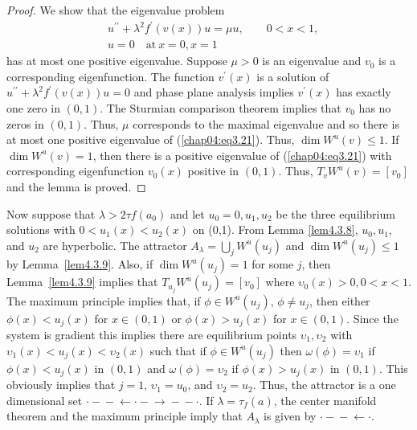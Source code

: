 \documentclass{surv-l}
\theoremstyle{plain}
\theoremstyle{definition}
\numberwithin{equation}{section}
\numberwithin{figure}{chapter}
\begin{document}
\begin{proof} We show that the eigenvalue problem
\begin{equation}\label{chap04:eq3.21}
\begin{split}
&u^{\prime\prime}+\lambda^{2}f^{\prime}(v(x))u=\mu u,\qquad 0<x<1,\\
&u=0\quad \mathrm{at}\ x=0, x=1
\end{split}
\end{equation}
has at most one positive eigenvalue. Suppose $\mu>0$ is an eigenvalue and $v_{0}$ is a corresponding eigenfunction. The function $v^{\prime}(x)$ is a solution of $u^{\prime\prime}+ \lambda^{2}f^{\prime}(v(x))u=0$ and phase plane analysis implies $v^{\prime}(x)$ has exactly one zero in $(0,1)$. The Sturmian comparison theorem implies that $v_{0}$ has no zeros in $(0,1)$. Thus, $\mu$ corresponds to the maximal eigenvalue and so there is at most one positive eigenvalue of (\ref{chap04:eq3.21}). Thus, $\dim W^{u}(v)\leq 1$. If $\dim W^{u}(v)=1$, then there is a positive eigenvalue of (\ref{chap04:eq3.21}) with corresponding eigenfunction $v_{0}(x)$ positive in $(0,1)$. Thus, $T_{v}W^{u}(v)=[v_{0}]$ and the lemma is proved.
\end{proof}

Now suppose that $\lambda>2\tau f(a_{0})$ and let $u_{0}=0, u_{1}, u_{2}$ be the three equilibrium solutions with $0<u_{1}(x)<u_{2}(x)$ on (0,1). From Lemma \ref{lem4.3.8}, $u_{0}, u_{1}$, and $u_{2}$ are hyperbolic. The attractor $A_{\lambda}=\bigcup_{j}W^{u}(u_{j})$ and $\dim W^{u}(u_{j})\leq 1$ by Lemma~\ref{lem4.3.9}. Also, if $\dim W^{u}(u_{j})=1$ for some $j$, then Lemma~\ref{lem4.3.9} implies that $T_{u_{j}}W^{u}(u_{j})=[v_{0}]$ where $\upsilon_{0}(x)>0,0<x<1$. The maximum principle implies that, if $\phi \in W^{u}(u_{j})$, $\phi \neq u_{j}$, then either $\phi(x)<u_{j}(x)$ for $x\in(0,1)$ or $\phi(x)>u_{j}(x)$ for $x\in(0,1)$. Since the system is gradient this implies there are equilibrium points $\upsilon_{1},\upsilon_{2}$ with $\upsilon_{1}(x)<u_{j}(x)<\upsilon_{2}(x)$ such that if $\phi \in W^{u}(u_{j})$ then $\omega(\phi)=\upsilon_{1}$ if $\phi(x)<u_{j}(x)$ in $(0,1)$ and $\omega(\phi)=\upsilon_{2}$ if $\phi(x)>u_{j}(x)$ in $(0,1)$. This obviously implies that $j=1,\,\upsilon_{1}=u_{0}$, and $\upsilon_{2}=u_{2}$. Thus, the attractor is a one dimensional set $\cdot-\!\!\!-\!\!\!\leftarrow\cdot-\!\!\!\rightarrow\!\!\!-\!\!\!-\cdot$. If $\lambda=\tau_{f}(a)$, the center manifold theorem and the maximum principle imply that $A_{\lambda}$ is given by $\cdot-\!\!\!-\!\!\!\leftarrow\cdot$.
\end{document}
